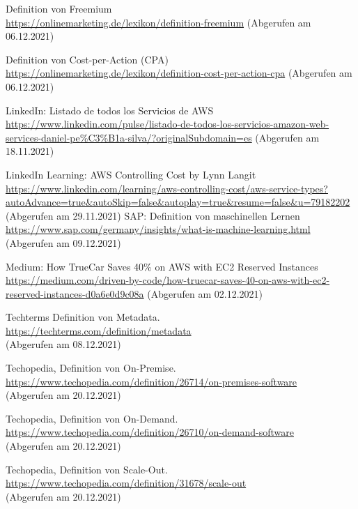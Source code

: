 \begin{thebibliography}{HR08}
  Definition von Freemium\\
 \url{https://onlinemarketing.de/lexikon/definition-freemium}
 (Abgerufen am 06.12.2021)
  
  Definition von Cost-per-Action (CPA)\\
 \url{https://onlinemarketing.de/lexikon/definition-cost-per-action-cpa}
 (Abgerufen am 06.12.2021)
 
  LinkedIn: Listado de todos los Servicios de AWS\\
 \url{https://www.linkedin.com/pulse/listado-de-todos-los-servicios-amazon-web-services-daniel-pe%C3%B1a-silva/?originalSubdomain=es}
 (Abgerufen am 18.11.2021)

  LinkedIn Learning: AWS Controlling Cost by Lynn Langit\\
 \url{https://www.linkedin.com/learning/aws-controlling-cost/aws-service-types?autoAdvance=true&autoSkip=false&autoplay=true&resume=false&u=79182202}
 (Abgerufen am 29.11.2021)
 SAP: Definition von maschinellen Lernen\\
 \url{https://www.sap.com/germany/insights/what-is-machine-learning.html}
 (Abgerufen am 09.12.2021)

 Medium: How TrueCar Saves 40\% on AWS with EC2 Reserved Instances\\
 \url{https://medium.com/driven-by-code/how-truecar-saves-40-on-aws-with-ec2-reserved-instances-d0a6e0d9c08a}
 (Abgerufen am 02.12.2021)
 
  Techterms Definition von Metadata.\\
 \url{https://techterms.com/definition/metadata}\\
 (Abgerufen am 08.12.2021)

 Techopedia, Definition von On-Premise.\\
 \url{https://www.techopedia.com/definition/26714/on-premises-software}\\
 (Abgerufen am 20.12.2021)
 
 Techopedia, Definition von On-Demand.\\
 \url{https://www.techopedia.com/definition/26710/on-demand-software}\\
 (Abgerufen am 20.12.2021)

  Techopedia, Definition von Scale-Out.\\
 \url{https://www.techopedia.com/definition/31678/scale-out}\\
 (Abgerufen am 20.12.2021)


\end{thebibliography}
